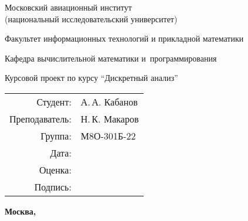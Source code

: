 \begin{titlepage}
	\begin{center}
		\bfseries
		
		{\Large Московский авиационный институт\\ (национальный исследовательский университет)
			
		}
		
		\vspace{48pt}
		
		{\large Факультет информационных технологий и прикладной математики
		}
		
		\vspace{36pt}
		
		{\large Кафедра вычислительной математики и~программирования
			
		}
		
		
		\vspace{48pt}
		
		Курсовой проект по курсу \enquote{Дискретный анализ}
		
	\end{center}
	
	\vspace{72pt}
	
	\begin{flushright}
		\begin{tabular}{rl}
			Студент: & А.\,А. Кабанов \\
			Преподаватель: & Н.\,К. Макаров \\
			Группа: & М8О-301Б-22 \\
			Дата: & \\
			Оценка: & \\
			Подпись: & \\
		\end{tabular}
	\end{flushright}
	
	\vfill
	
	\begin{center}
		\bfseries
		Москва, \the\year
	\end{center}
\end{titlepage}

\pagebreak
